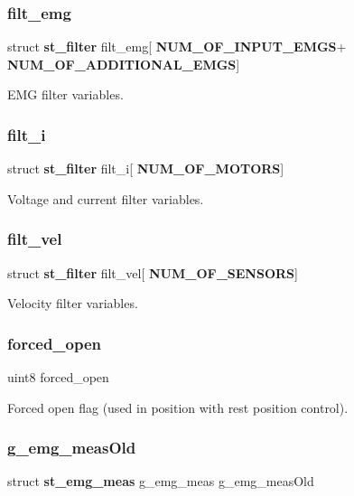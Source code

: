\subsubsection{filt\+\_\+emg}
{\footnotesize\ttfamily struct \textbf{ st\+\_\+filter} filt\+\_\+emg[\textbf{ N\+U\+M\+\_\+\+O\+F\+\_\+\+I\+N\+P\+U\+T\+\_\+\+E\+M\+GS}+\textbf{ N\+U\+M\+\_\+\+O\+F\+\_\+\+A\+D\+D\+I\+T\+I\+O\+N\+A\+L\+\_\+\+E\+M\+GS}]}

E\+MG filter variables. \mbox{\label{globals_8c_ad09553d6780c43066a9ac4385658bcf1}} 
\subsubsection{filt\+\_\+i}
{\footnotesize\ttfamily struct \textbf{ st\+\_\+filter} filt\+\_\+i[\textbf{ N\+U\+M\+\_\+\+O\+F\+\_\+\+M\+O\+T\+O\+RS}]}

Voltage and current filter variables. \mbox{\label{globals_8c_af2dc9b0614aeaf7a377d209416bee61c}} 
\subsubsection{filt\+\_\+vel}
{\footnotesize\ttfamily struct \textbf{ st\+\_\+filter} filt\+\_\+vel[\textbf{ N\+U\+M\+\_\+\+O\+F\+\_\+\+S\+E\+N\+S\+O\+RS}]}

Velocity filter variables. \mbox{\label{globals_8c_a0f13b80a0c329fa3176eb1e72ef36fb8}} 
\subsubsection{forced\+\_\+open}
{\footnotesize\ttfamily uint8 forced\+\_\+open}

Forced open flag (used in position with rest position control). \mbox{\label{globals_8c_a85e15a194417ebcd15f662bd9bcfdded}} 
\subsubsection{g\+\_\+emg\+\_\+meas\+Old}
{\footnotesize\ttfamily struct \textbf{ st\+\_\+emg\+\_\+meas} g\+\_\+emg\+\_\+meas g\+\_\+emg\+\_\+meas\+Old}

